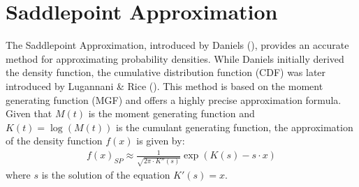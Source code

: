 \section{Saddlepoint Approximation}

The Saddlepoint Approximation, introduced by Daniels (\citeyear{danielsSaddlepointApproximationsStatistics1954}), provides an accurate method for approximating probability densities. While Daniels initially derived the density function, the cumulative distribution function (CDF) was later introduced by Lugannani \& Rice (\citeyear{lugannaniSaddlePointApproximation1980}). This method is based on the moment generating function (MGF) and offers a highly precise approximation formula. Given that $M(t)$ is the moment generating function and $K(t) = \log(M(t))$ is the cumulant generating function, the approximation of the density function $f(x)$ is given by:
\begin{align}
    \label{eq:sp_approximation}
    f(x)_{SP} \approx \frac{1}{\sqrt{2\pi\cdot K''(s)}}\exp(K(s) - s\cdot x)
\end{align}
where $s$ is the solution of the equation $K'(s) = x$.

